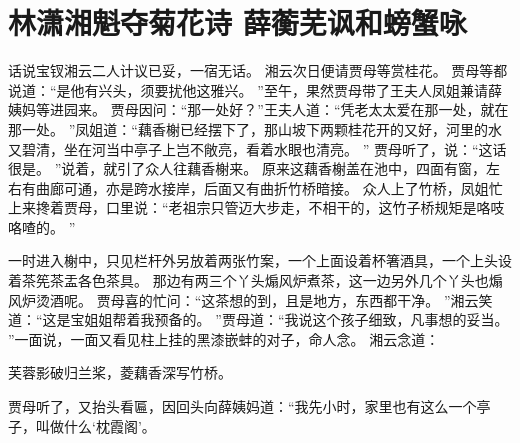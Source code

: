 \chapter{林潇湘魁夺菊花诗 \quad 薛蘅芜讽和螃蟹咏}
\par
话说宝钗湘云二人计议已妥，一宿无话。
湘云次日便请贾母等赏桂花。
贾母等都说道：“是他有兴头，须要扰他这雅兴。
”至午，果然贾母带了王夫人凤姐兼请薛姨妈等进园来。
贾母因问：“那一处好？”王夫人道：“凭老太太爱在那一处，就在那一处。
”凤姐道：“藕香榭已经摆下了，那山坡下两颗桂花开的又好，河里的水又碧清，坐在河当中亭子上岂不敞亮，看着水眼也清亮。
”
贾母听了，说：“这话很是。
”说着，就引了众人往藕香榭来。
原来这藕香榭盖在池中，四面有窗，左右有曲廊可通，亦是跨水接岸，后面又有曲折竹桥暗接。
众人上了竹桥，凤姐忙上来搀着贾母，口里说：“老祖宗只管迈大步走，不相干的，这竹子桥规矩是咯吱咯喳的。
”\par
一时进入榭中，只见栏杆外另放着两张竹案，一个上面设着杯箸酒具，一个上头设着茶筅茶盂各色茶具。
那边有两三个丫头煽风炉煮茶，这一边另外几个丫头也煽风炉烫酒呢。
贾母喜的忙问：“这茶想的到，且是地方，东西都干净。
”湘云笑道：“这是宝姐姐帮着我预备的。
”贾母道：“我说这个孩子细致，凡事想的妥当。
”一面说，一面又看见柱上挂的黑漆嵌蚌的对子，命人念。
湘云念道：\par
\hop
芙蓉影破归兰桨，菱藕香深写竹桥。
\par
\hop
贾母听了，又抬头看匾，因回头向薛姨妈道：“我先小时，家里也有这么一个亭子，叫做什么‘枕霞阁’。
